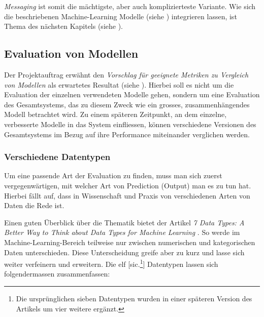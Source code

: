 \textit{Messaging} ist somit die mächtigste, aber auch komplizierteste Variante. Wie sich die beschriebenen Machine-Learning Modelle (siehe ) integrieren lassen, ist Thema des nächsten Kapitels (siehe ).

\subsection{Evaluation von Modellen}
\label{sec:evaluation-von-modellen}

Der Projektauftrag erwähnt den \textit{Vorschlag für geeignete Metriken zu Vergleich von Modellen} als erwartetes Resultat (siehe ). Hierbei soll es nicht um die Evaluation der einzelnen verwendeten Modelle gehen, sondern um eine Evaluation des Gesamtsystems, das zu diesem Zweck wie ein grosses, zusammenhängendes Modell betrachtet wird. Zu einem späteren Zeitpunkt, an dem einzelne, verbesserte Modelle in das System einfliessen, können verschiedene Versionen des Gesamtsystems im Bezug auf ihre Performance miteinander verglichen werden.

\subsubsection{Verschiedene Datentypen}
\label{sec:verschiedene-datentypen}

Um eine passende Art der Evaluation zu finden, muss man sich zuerst vergegenwärtigen, mit welcher Art von Prediction (Output) man es zu tun hat. Hierbei fällt auf, dass in Wissenschaft und Praxis von verschiedenen Arten von Daten die Rede ist.

Einen guten Überblick über die Thematik bietet der Artikel \textit{7 Data Types: A Better Way to Think about Data Types for Machine Learning} \cite{7-data-types}. So werde im Machine-Learning-Bereich teilweise nur zwischen numerischen und kategorischen Daten unterschieden. Diese Unterscheidung greife aber zu kurz und lasse sich weiter verfeinern und erweitern. Die elf [sic.\footnote{Die ursprünglichen sieben Datentypen wurden in einer späteren Version des Artikels um vier weitere ergänzt.}] Datentypen lassen sich folgendermassen zusammenfassen:

